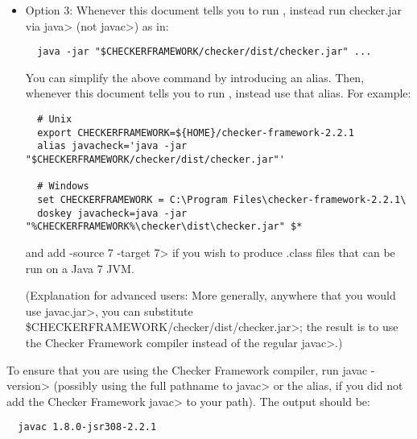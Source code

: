 \begin{itemize}
   \item
   Option 3:
   Whenever this document tells you to run , instead
   run checker.jar via \<java> (not \<javac>) as in:

\begin{Verbatim}
  java -jar "$CHECKERFRAMEWORK/checker/dist/checker.jar" ...
\end{Verbatim}

    You can simplify the above command by introducing an alias.  Then,
    whenever this document tells you to run , instead use that
    alias.  For example:

\begin{Verbatim}
  # Unix
  export CHECKERFRAMEWORK=${HOME}/checker-framework-2.2.1
  alias javacheck='java -jar "$CHECKERFRAMEWORK/checker/dist/checker.jar"'

  # Windows
  set CHECKERFRAMEWORK = C:\Program Files\checker-framework-2.2.1\
  doskey javacheck=java -jar "%CHECKERFRAMEWORK%\checker\dist\checker.jar" $*
\end{Verbatim}

   \noindent
   and add \<-source 7 -target 7> if you wish to produce .class files that
   can be run on a Java 7 JVM.

   (Explanation for advanced users:  More generally, anywhere that you would use \<javac.jar>, you can substitute
   \<\$CHECKERFRAMEWORK/checker/dist/checker.jar>;
   the result is to use the Checker
   Framework compiler instead of the regular \<javac>.)

\end{itemize}


To ensure that you are using the Checker Framework compiler, run
\<javac -version> (possibly using the
full pathname to \<javac> or the alias, if you did not add the Checker
Framework \<javac> to your path).
The output should be:

\begin{Verbatim}
  javac 1.8.0-jsr308-2.2.1
\end{Verbatim}




